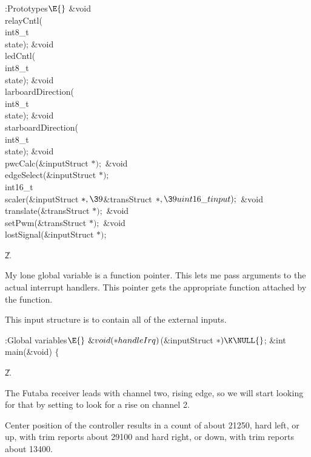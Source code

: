 \B{}:Prototypes\X${}\E{}$\6
\&{void} \\{relayCntl}(\\{int8\_t}\\{state});\6
\&{void} \\{ledCntl}(\\{int8\_t}\\{state});\6
\&{void} \\{larboardDirection}(\\{int8\_t}\\{state});\6
\&{void} \\{starboardDirection}(\\{int8\_t}\\{state});\6
\&{void} \\{pwcCalc}(\&{inputStruct} ${}{*});{}$\6
\&{void} \\{edgeSelect}(\&{inputStruct} ${}{*});{}$\7
\\{int16\_t}\\{scaler}(\&{inputStruct} ${}{*},\39{}$\&{transStruct} ${}{*},\39%
\\{uint16\_t}\\{input});{}$\7
\&{void} \\{translate}(\&{transStruct} ${}{*});{}$\6
\&{void} \\{setPwm}(\&{transStruct} ${}{*});{}$\6
\&{void} \\{lostSignal}(\&{inputStruct} ${}{*}){}$;\par
\U2.\fi

My lone global variable is a function pointer.
This lets me pass arguments to the actual interrupt handlers.
This pointer gets the appropriate function attached by the 
function.

This input structure is to contain all of the external inputs.

\Y\B\4:Global variables\X${}\E{}$\6
$\&{void}({*}\\{handleIrq}){}$(\&{inputStruct} ${}{*})\K\NULL{}$;\7
\&{int} \\{main}(\&{void})\1\1\7
$\{{}$\Y\par
\U2.\fi

The Futaba receiver leads with channel two, rising edge, so we will start
looking for that by setting  to look for a rise on channel 2.

Center position of the controller results in a count of about 21250,
hard left, or up, with trim reports about 29100 and hard right, or down,
with trim reports about 13400.

